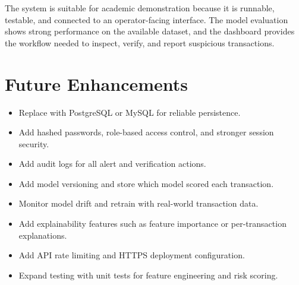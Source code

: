 \documentclass[12pt,a4paper]{report}
\begin{document}
The system is suitable for academic demonstration because it is runnable, testable, and connected to an operator-facing interface. The model evaluation shows strong performance on the available dataset, and the dashboard provides the workflow needed to inspect, verify, and report suspicious transactions.

\section{Future Enhancements}
\begin{itemize}
    \item Replace  with PostgreSQL or MySQL for reliable persistence.
    \item Add hashed passwords, role-based access control, and stronger session security.
    \item Add audit logs for all alert and verification actions.
    \item Add model versioning and store which model scored each transaction.
    \item Monitor model drift and retrain with real-world transaction data.
    \item Add explainability features such as feature importance or per-transaction explanations.
    \item Add API rate limiting and HTTPS deployment configuration.
    \item Expand testing with unit tests for feature engineering and risk scoring.
\end{itemize}

\renewcommand{\bibname}{References}


\end{document}

